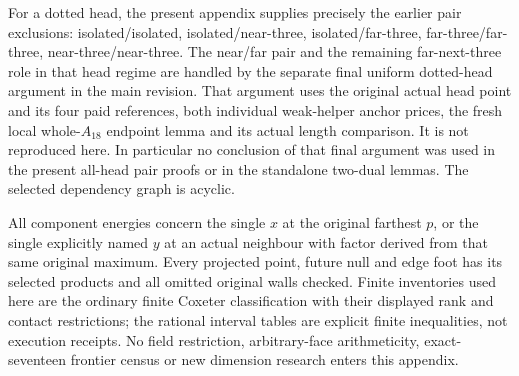 For a dotted head, the present appendix supplies precisely the
earlier pair exclusions: isolated/isolated, isolated/near-three,
isolated/far-three, far-three/far-three, near-three/near-three.
The near/far pair and the remaining far-next-three role in that
head regime are handled by the separate final uniform dotted-head
argument in the main revision.
That argument uses the original actual head point and its four
paid references, both individual weak-helper anchor prices, the
fresh local whole-\(A_{18}\) endpoint lemma and its actual length
comparison.  It is not reproduced here.
In particular no conclusion of that final argument was used in
the present all-head pair proofs or in the standalone two-dual
lemmas.  The selected dependency graph is acyclic.

All component energies concern the single \(x\) at the original
farthest \(p\), or the single explicitly named \(y\) at an actual
neighbour with factor derived from that same original maximum.
Every projected point, future null and edge foot has its selected
products and all omitted original walls checked.
Finite inventories used here are the ordinary finite Coxeter
classification with their displayed rank and contact restrictions;
the rational interval tables are explicit finite inequalities,
not execution receipts.  No field restriction, arbitrary-face
arithmeticity, exact-seventeen frontier census or new dimension
research enters this appendix.













